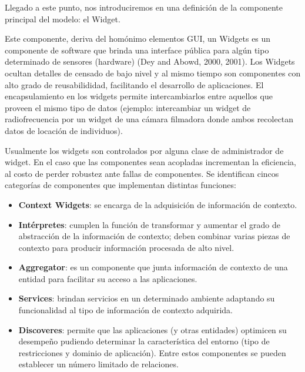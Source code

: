 Llegado a este punto, nos introduciremos en una definición de la componente
principal
del modelo: el Widget.


Este componente, deriva del homónimo elementos GUI, un Widgets es un componente
de software que brinda una interface pública para algún tipo determinado de
sensores
(hardware) (Dey and Abowd, 2000, 2001). Los Widgets ocultan detalles de censado
de
bajo nivel y al mismo tiempo son componentes con alto grado de reusabilididad,
facilitando el desarrollo de aplicaciones. El encapsulamiento en los widgets
permite
intercambiarlos entre aquellos que proveen el mismo tipo de datos (ejemplo:
intercambiar un widget de radiofrecuencia por un widget de una cámara filmadora
donde ambos recolectan datos de locación de individuos).


Usualmente los widgets son controlados por alguna clase de administrador de
widget.
En el caso que las componentes sean acopladas incrementan la eficiencia, al
costo de
perder robustez ante fallas de componentes.
Se identifican cincos categorías de componentes que implementan distintas
funciones:

\begin{itemize}

\item 
\textbf{Context Widgets}: se encarga de la adquisición de información de
contexto.

\item
\textbf{Intérpretes}: cumplen la función de transformar y aumentar el grado de
abstracción de la información de contexto; deben combinar varias piezas de
contexto para producir información procesada de alto nivel.

\item
\textbf{Aggregator}: es un componente que junta información de contexto de una
entidad para facilitar su acceso a las aplicaciones.

\item
\textbf{Services}: brindan servicios en un determinado ambiente adaptando su
funcionalidad al tipo de información de contexto adquirida.

\item
\textbf{Discoveres}: permite que las aplicaciones (y otras entidades) optimicen
su desempeño pudiendo determinar la característica del entorno (tipo de
restricciones y dominio de aplicación). Entre estos componentes se pueden
establecer un número limitado de relaciones.

\end{itemize} 

